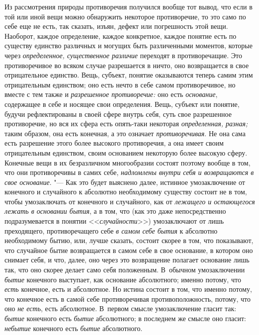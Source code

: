 Из рассмотрения природы противоречия получился вообще тот вывод, что если в
той или иной вещи можно обнаружить некоторое противоречие, то это само по
себе еще не есть, так сказать, изъян, дефект или погрешность этой вещи.
Наоборот, каждое определение, каждое конкретное, каждое понятие есть по
существу единство различных и могущих быть различенными моментов, которые
через {\em определенное, существенное различие}
переходят в противоречащие. Это противоречивое во всяком случае разрешается
в ничто, оно возвращается в свое отрицательное единство. Вещь, субъект,
понятие оказываются теперь самим этим отрицательным единством; оно есть
нечто в себе самом противоречивое, но вместе с тем также и
{\em разрешенное противоречие:} оно есть
{\em основание}, содержащее в себе и носящее свои
определения. Вещь, субъект или понятие, будучи рефлектированы в своей сфере
внутрь себя, суть свое разрешенное противоречие, но вся их сфера есть
опять-таки некоторая {\em определенная, разная;} таким
образом, она есть конечная, а это означает
{\em противоречивая}. Не она сама есть разрешение этого
более высокого противоречия, а она имеет своим отрицательным единством,
своим основанием некоторую более высокую сферу. Конечные вещи в их
безразличном многообразии состоят поэтому вообще в том, что они
противоречивы в самих себе, {\em надломлены внутри себя
и возвращаются в свое основание}. "--- Как это будет выяснено далее, истинное
умозаключение от конечного и случайного к абсолютно необходимому существу
состоит не в том, чтобы умозаключать от конечного и случайного, как от
{\em лежащего и остающегося лежать в основании бытия},
а в том, что (как это даже непосредственно подразумевается в понятии
<<{\em случайности}>>) умозаключают от лишь преходящего,
противоречащего себе {\em в самом себе бытия} к
абсолютно необходимому бытию, или, лучше сказать, состоит скорее в том, что
показывают, что случайное бытие возвращается в самом себе в свое основание,
в котором оно снимает себя, и что, далее, оно через это возвращение
полагает основание лишь так, что оно скорее делает само себя положенным.
В~обычном умозаключении {\em бытие} конечного выступает,
как основание абсолютного; именно потому, что
{\em есть} конечное, есть и абсолютное. Но истина
состоит в том, что именно потому, что конечное есть в самой себе
противоречивая противоположность, потому, что оно
{\em не есть}, есть абсолютное. В~первом смысле
умозаключение гласит так: {\em бытие} конечного есть
{\em бытие} абсолютного; в последнем же смысле оно
гласит: {\em небытие} конечного есть {\em бытие} абсолютного.
